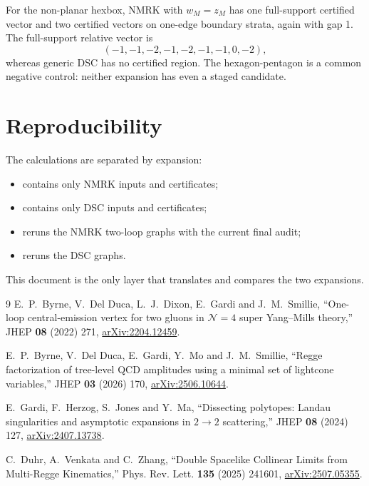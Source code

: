 \documentclass[11pt]{article}
\begin{document}
For the non-planar hexbox, NMRK with \(w_M=z_M\) has one full-support certified
vector and two certified vectors on one-edge boundary strata, again with gap
1.  The full-support relative vector is
\begin{equation}
(-1,-1,-2,-1,-2,-1,-1,0,-2),
\end{equation}
whereas generic DSC has no certified region.  The hexagon-pentagon is a
common negative control: neither expansion has even a staged candidate.

\section{Reproducibility}

The calculations are separated by expansion:
\begin{itemize}
 \item {} contains only NMRK inputs and
 certificates;
 \item {} contains only DSC inputs and
 certificates;
 \item {} reruns the NMRK two-loop
 graphs with the current final audit;
 \item {} reruns the DSC graphs.
\end{itemize}
This document is the only layer that translates and compares the two
expansions.

\begingroup
\small
\begin{thebibliography}{9}
E.~P.~Byrne, V.~Del Duca, L.~J.~Dixon, E.~Gardi and J.~M.~Smillie,
``One-loop central-emission vertex for two gluons in
\(\mathcal N=4\) super Yang--Mills theory,'' JHEP \textbf{08} (2022) 271,
\href{https://arxiv.org/abs/2204.12459}{arXiv:2204.12459}.

E.~P.~Byrne, V.~Del Duca, E.~Gardi, Y.~Mo and J.~M.~Smillie,
``Regge factorization of tree-level QCD amplitudes using a minimal set of
lightcone variables,'' JHEP \textbf{03} (2026) 170,
\href{https://arxiv.org/abs/2506.10644}{arXiv:2506.10644}.

E.~Gardi, F.~Herzog, S.~Jones and Y.~Ma,
``Dissecting polytopes: Landau singularities and asymptotic expansions in
\(2\to2\) scattering,'' JHEP \textbf{08} (2024) 127,
\href{https://arxiv.org/abs/2407.13738}{arXiv:2407.13738}.

C.~Duhr, A.~Venkata and C.~Zhang,
``Double Spacelike Collinear Limits from Multi-Regge Kinematics,''
Phys. Rev. Lett. \textbf{135} (2025) 241601,
\href{https://arxiv.org/abs/2507.05355}{arXiv:2507.05355}.
\end{thebibliography}
\endgroup
\end{document}
